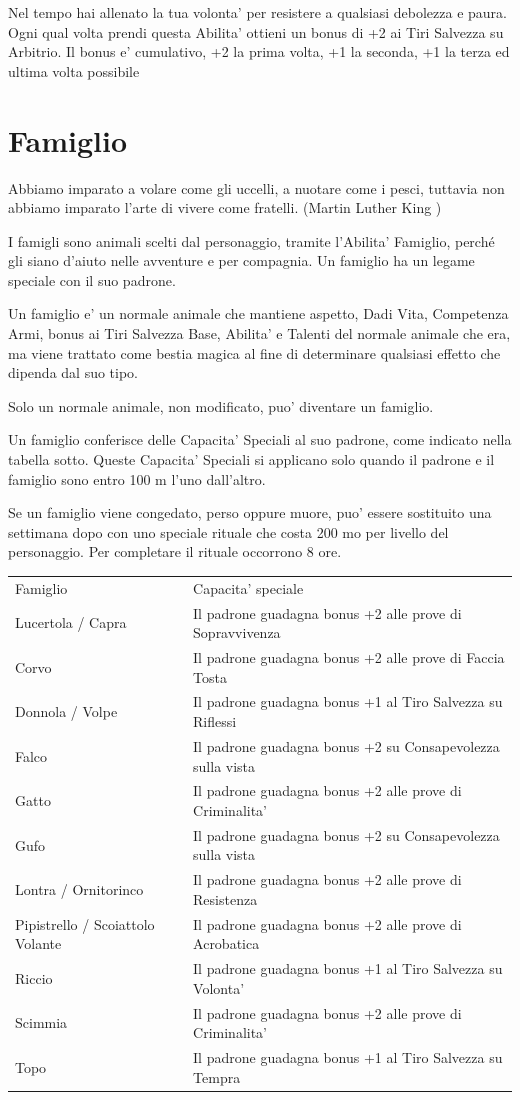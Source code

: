 \documentclass[a4paper,11pt,twoside,openany]{dndbook}
\begin{document}
Nel tempo hai allenato la tua volonta' per resistere a qualsiasi debolezza e paura. Ogni qual volta prendi questa Abilita' ottieni un bonus di +2 ai Tiri Salvezza su Arbitrio. Il bonus e' cumulativo, +2 la prima volta, +1 la seconda, +1 la terza ed ultima volta possibile

\pagebreak

\section{Famiglio}

\label{famiglio}
\begin{quotebox}
Abbiamo imparato a volare come gli uccelli, a nuotare come i pesci, tuttavia non abbiamo imparato l'arte di vivere come fratelli. (Martin Luther King )
\end{quotebox}

I famigli sono animali scelti dal personaggio, tramite l'Abilita' Famiglio, perché gli siano d'aiuto nelle avventure e per compagnia. Un famiglio ha un legame speciale con il suo padrone.

Un famiglio e' un normale animale che mantiene aspetto, Dadi Vita, Competenza Armi, bonus ai Tiri Salvezza Base, Abilita' e Talenti del normale animale che era, ma viene trattato come bestia magica al fine di determinare qualsiasi effetto che dipenda dal suo tipo. 

Solo un normale animale, non modificato, puo' diventare un famiglio.

Un famiglio conferisce delle Capacita' Speciali al suo padrone, come indicato nella tabella sotto. Queste Capacita' Speciali si applicano solo quando il padrone e il famiglio sono entro 100 m l'uno dall'altro.

Se un famiglio viene congedato, perso oppure muore, puo' essere sostituito una settimana dopo con uno speciale rituale che costa 200 mo per livello del personaggio. Per {\small completare} il rituale occorrono 8 ore.

\bigskip

\begin{tabular}[c]{@{}ll@{}}
\toprule 
Famiglio & Capacita' speciale\tabularnewline
Lucertola / Capra & Il padrone guadagna bonus +2 alle prove di Sopravvivenza\tabularnewline
Corvo & Il padrone guadagna bonus +2 alle prove di Faccia Tosta\tabularnewline
Donnola / Volpe & Il padrone guadagna bonus +1 al Tiro Salvezza su Riflessi\tabularnewline
Falco & Il padrone guadagna bonus +2 su Consapevolezza sulla vista\tabularnewline
Gatto & Il padrone guadagna bonus +2 alle prove di Criminalita'\tabularnewline
Gufo & Il padrone guadagna bonus +2 su Consapevolezza sulla vista\tabularnewline
Lontra / Ornitorinco & Il padrone guadagna bonus +2 alle prove di Resistenza\tabularnewline
Pipistrello / Scoiattolo Volante & Il padrone guadagna bonus +2 alle prove di Acrobatica\tabularnewline
Riccio & Il padrone guadagna bonus +1 al Tiro Salvezza su Volonta'\tabularnewline
Scimmia & Il padrone guadagna bonus +2 alle prove di Criminalita'\tabularnewline
Topo & Il padrone guadagna bonus +1 al Tiro Salvezza su Tempra\tabularnewline
\bottomrule
\end{tabular}
\end{document}
